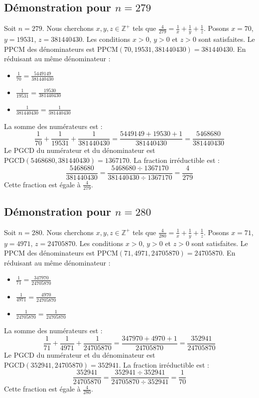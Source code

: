 \documentclass[11pt,a4paper]{article}
\begin{document}
\subsection{Démonstration pour $n = 279$}
Soit $n = 279$. Nous cherchons $x, y, z \in \mathbb{Z}^{+}$ tels que $\frac{4}{279} = \frac{1}{x} + \frac{1}{y} + \frac{1}{z}$.
Posons $x = 70$, $y = 19531$, $z = 381440430$.
Les conditions $x > 0$, $y > 0$ et $z > 0$ sont satisfaites.
Le PPCM des dénominateurs est $\text{PPCM}(70, 19531, 381440430) = 381440430$.
En réduisant au même dénominateur :
\begin{itemize}
    \item $\frac{1}{70} = \frac{5449149}{381440430}$
    \item $\frac{1}{19531} = \frac{19530}{381440430}$
    \item $\frac{1}{381440430} = \frac{1}{381440430}$
\end{itemize}
La somme des numérateurs est :
$$ \frac{1}{70} + \frac{1}{19531} + \frac{1}{381440430} = \frac{5449149 + 19530 + 1}{381440430} = \frac{5468680}{381440430} $$
Le PGCD du numérateur et du dénominateur est $\text{PGCD}(5468680, 381440430) = 1367170$.
La fraction irréductible est :
$$ \frac{5468680}{381440430} = \frac{5468680 \div 1367170}{381440430 \div 1367170} = \frac{4}{279} $$
Cette fraction est égale à $\frac{4}{279}$.

\subsection{Démonstration pour $n = 280$}
Soit $n = 280$. Nous cherchons $x, y, z \in \mathbb{Z}^{+}$ tels que $\frac{4}{280} = \frac{1}{x} + \frac{1}{y} + \frac{1}{z}$.
Posons $x = 71$, $y = 4971$, $z = 24705870$.
Les conditions $x > 0$, $y > 0$ et $z > 0$ sont satisfaites.
Le PPCM des dénominateurs est $\text{PPCM}(71, 4971, 24705870) = 24705870$.
En réduisant au même dénominateur :
\begin{itemize}
    \item $\frac{1}{71} = \frac{347970}{24705870}$
    \item $\frac{1}{4971} = \frac{4970}{24705870}$
    \item $\frac{1}{24705870} = \frac{1}{24705870}$
\end{itemize}
La somme des numérateurs est :
$$ \frac{1}{71} + \frac{1}{4971} + \frac{1}{24705870} = \frac{347970 + 4970 + 1}{24705870} = \frac{352941}{24705870} $$
Le PGCD du numérateur et du dénominateur est $\text{PGCD}(352941, 24705870) = 352941$.
La fraction irréductible est :
$$ \frac{352941}{24705870} = \frac{352941 \div 352941}{24705870 \div 352941} = \frac{1}{70} $$
Cette fraction est égale à $\frac{4}{280}$.
\end{document}
